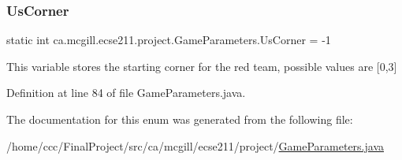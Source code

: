 \mbox{\label{enumca_1_1mcgill_1_1ecse211_1_1project_1_1_game_parameters_a5268b4efd3f069f08cca810e309b51dd}} 
\subsubsection{\texorpdfstring{Us\+Corner}{UsCorner}}
{\footnotesize\ttfamily  static  int ca.\+mcgill.\+ecse211.\+project.\+Game\+Parameters.\+Us\+Corner = -\/1\hspace{0.3cm}{\ttfamily [static]}}

This variable stores the starting corner for the red team, possible values are \mbox{[}0,3\mbox{]} 

Definition at line 84 of file Game\+Parameters.\+java.



The documentation for this enum was generated from the following file\+:\begin{DoxyCompactItemize}
\item 
/home/ccc/\+Final\+Project/src/ca/mcgill/ecse211/project/\hyperlink{_game_parameters_8java}{Game\+Parameters.\+java}\end{DoxyCompactItemize}
